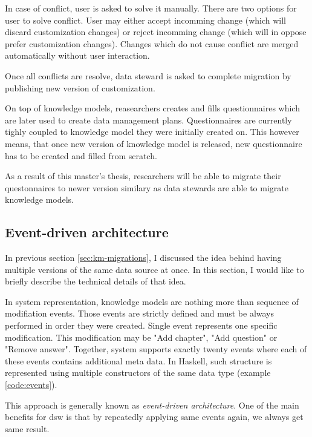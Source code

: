 In case of conflict, user is asked to solve it manually.
There are two options for user to solve conflict.
User may either accept incomming change (which will discard customization changes) or reject incomming change (which will in oppose prefer customization changes).
Changes which do not cause conflict are merged automatically without user interaction.

Once all conflicts are resolve, data steward is asked to complete migration by publishing new version of customization.

On top of knowledge models, reasearchers creates and fills questionnaires which are later used to create data management plans.
Questionnaires are currently tighly coupled to knowledge model they were initially created on.
This however means, that once new version of knowledge model is released, new questionnaire has to be created and filled from scratch.

As a result of this master's thesis, researchers will be able to migrate their questonnaires to newer version similary as data stewards are able to migrate knowledge models.

\subsection{Event-driven architecture}

In previous section \ref{sec:km-migrations}, I discussed the idea behind having multiple versions of the same data source at once.
In this section, I would like to briefly describe the technical details of that idea.

In system representation, knowledge models are nothing more than sequence of modifiation events.
Those events are strictly defined and must be always performed in order they were created.
Single event represents one specific modification.
This modification may be "Add chapter", "Add question" or "Remove answer".
Together, system supports exactly twenty events where each of these events contains additional meta data.
In Haskell, such structure is represented using multiple constructors of the same data type (example \ref{code:events}).


This approach is generally known as \textit{event-driven architecture}\cite{mdm-event-architecture}.
One of the main benefits for \gls{dsw} is that by repeatedly applying same events again, we always get same result.

